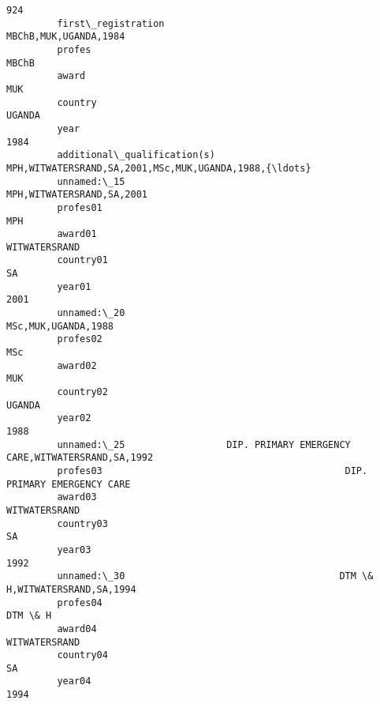 \documentclass[11pt]{article}
\begin{document}
\begin{Verbatim}[commandchars=\\\{\}]
                                                                                    924  
         first\_registration                                       MBChB,MUK,UGANDA,1984  
         profes                                                                   MBChB  
         award                                                                      MUK  
         country                                                                 UGANDA  
         year                                                                      1984  
         additional\_qualification(s)  MPH,WITWATERSRAND,SA,2001,MSc,MUK,UGANDA,1988,{\ldots}  
         unnamed:\_15                                          MPH,WITWATERSRAND,SA,2001  
         profes01                                                                   MPH  
         award01                                                          WITWATERSRAND  
         country01                                                                   SA  
         year01                                                                    2001  
         unnamed:\_20                                                MSc,MUK,UGANDA,1988  
         profes02                                                                   MSc  
         award02                                                                    MUK  
         country02                                                               UGANDA  
         year02                                                                    1988  
         unnamed:\_25                  DIP. PRIMARY EMERGENCY CARE,WITWATERSRAND,SA,1992  
         profes03                                           DIP. PRIMARY EMERGENCY CARE  
         award03                                                          WITWATERSRAND  
         country03                                                                   SA  
         year03                                                                    1992  
         unnamed:\_30                                      DTM \& H,WITWATERSRAND,SA,1994  
         profes04                                                               DTM \& H  
         award04                                                          WITWATERSRAND  
         country04                                                                   SA  
         year04                                                                    1994  
\end{Verbatim}
            
\end{document}
